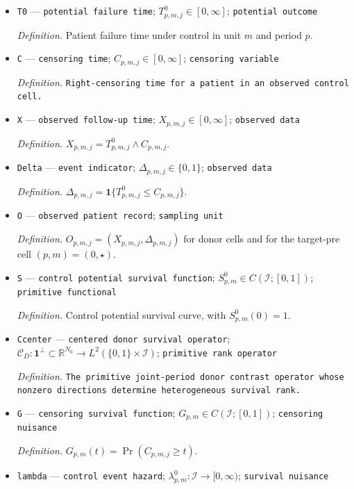 \documentclass{article}
\begin{document}
\begin{itemize}
  \item \texttt{T0} --- \texttt{potential failure time}; \(T^0_{p,m,j}\in[0,\infty]\); \texttt{potential outcome}
  \par\smallskip\noindent\emph{Definition.} Patient failure time under control in unit \(m\) and period \(p\).
  \item \texttt{C} --- \texttt{censoring time}; \(C_{p,m,j}\in[0,\infty]\); \texttt{censoring variable}
  \par\smallskip\noindent\emph{Definition.} \texttt{Right-\allowbreak{}censoring time for a patient in an observed control cell.}
  \item \texttt{X} --- \texttt{observed follow-\allowbreak{}up time}; \(X_{p,m,j}\in[0,\infty]\); \texttt{observed data}
  \par\smallskip\noindent\emph{Definition.} \(X_{p,m,j}=T^0_{p,m,j}\wedge C_{p,m,j}\).
  \item \texttt{Delta} --- \texttt{event indicator}; \(\Delta_{p,m,j}\in\{0,1\}\); \texttt{observed data}
  \par\smallskip\noindent\emph{Definition.} \(\Delta_{p,m,j}=\mathbf 1\{T^0_{p,m,j}\le C_{p,m,j}\}\).
  \item \texttt{O} --- \texttt{observed patient record}; \texttt{sampling unit}
  \par\smallskip\noindent\emph{Definition.} \(O_{p,m,j}=(X_{p,m,j},\Delta_{p,m,j})\) for donor cells and for the target-pre cell \((p,m)=(0,\star)\).
  \item \texttt{S} --- \texttt{control potential survival function}; \(S^0_{p,m}\in C(\mathcal I;[0,1])\); \texttt{primitive functional}
  \par\smallskip\noindent\emph{Definition.} Control potential survival curve, with \(S^0_{p,m}(0)=1\).
  \item \texttt{Ccenter} --- \texttt{centered donor survival operator}; \(\mathcal C_D:\mathbf 1^\perp\subset\mathbb R^{N_0}\to L^2(\{0,1\}\times\mathcal I)\); \texttt{primitive rank operator}
  \par\smallskip\noindent\emph{Definition.} \texttt{The primitive joint-\allowbreak{}period donor contrast operator whose nonzero directions determine heterogeneous survival rank.}
  \item \texttt{G} --- \texttt{censoring survival function}; \(G_{p,m}\in C(\mathcal I;[0,1])\); \texttt{censoring nuisance}
  \par\smallskip\noindent\emph{Definition.} \(G_{p,m}(t)=\Pr(C_{p,m,j}\ge t)\).
  \item \texttt{lambda} --- \texttt{control event hazard}; \(\lambda^0_{p,m}:\mathcal I\to[0,\infty)\); \texttt{survival nuisance}

\end{itemize}
\end{document}
